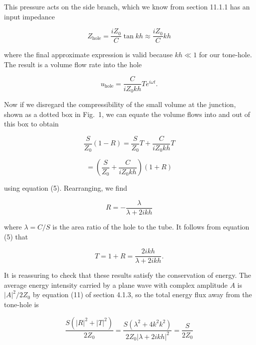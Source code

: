   This pressure acts on the side branch, which we know from section 11.1.1 has 
  an input impedance 

  \begin{equation*}Z_{\mathrm{hole}}=\dfrac{i Z_0}{C} \tan kh \approx \dfrac{i 
  Z_0}{C} kh \tag{6}\end{equation*} 

  \noindent{}where the final approximate expression is valid because $kh \ll 1$ 
  for our tone-hole. The result is a volume flow rate into the hole 

  \begin{equation*}u_{\mathrm{hole}}=\dfrac{C}{iZ_0 kh}T e^{i \omega t} . 
  \tag{7}\end{equation*} 

  Now if we disregard the compressibility of the small volume at the junction, 
  shown as a dotted box in Fig.\ 1, we can equate the volume flows into and out 
  of this box to obtain 

  \begin{equation*}\dfrac{S}{Z_0}(1-R)=\dfrac{S}{Z_0}T +\dfrac{C}{iZ_0 kh}T 
  \tag{8}\end{equation*} 

  \begin{equation*}=\left(\dfrac{S}{Z_0}+\dfrac{C}{iZ_0 kh} \right) (1+R) 
  \tag{9}\end{equation*} 

  \noindent{}using equation (5). Rearranging, we find 

  \begin{equation*}R=-\dfrac{\lambda}{\lambda+2ikh} \tag{10}\end{equation*} 

  \noindent{}where $\lambda=C/S$ is the area ratio of the hole to the tube. It 
  follows from equation (5) that 

  \begin{equation*}T=1+R = \dfrac{2ikh}{\lambda+2ikh} . \tag{11}\end{equation*} 

  It is reassuring to check that these results satisfy the conservation of 
  energy. The average energy intensity carried by a plane wave with complex 
  amplitude $A$ is $|A|^2/2Z_0$ by equation (11) of section 4.1.3, so the total 
  energy flux away from the tone-hole is 

  \begin{equation*}\dfrac{S(|R|^2 + |T|^2)}{2Z_0} = \dfrac{S(\lambda^2+ 
  4k^2k^2)}{2Z_0|\lambda+2ikh|^2} = \dfrac{S}{2Z_0} \tag{12}\end{equation*} 

